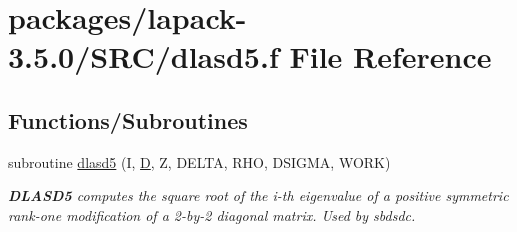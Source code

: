 \hypertarget{dlasd5_8f}{}\section{packages/lapack-\/3.5.0/\+S\+R\+C/dlasd5.f File Reference}
\label{dlasd5_8f}
\subsection*{Functions/\+Subroutines}
\begin{DoxyCompactItemize}
\item 
subroutine \hyperlink{group__auxOTHERauxiliary_gac354f735ef3e53f9ca32242d2db96f74}{dlasd5} (I, \hyperlink{odrpack_8h_a7dae6ea403d00f3687f24a874e67d139}{D}, Z, D\+E\+L\+T\+A, R\+H\+O, D\+S\+I\+G\+M\+A, W\+O\+R\+K)
\begin{DoxyCompactList}\small\item\em {\bfseries D\+L\+A\+S\+D5} computes the square root of the i-\/th eigenvalue of a positive symmetric rank-\/one modification of a 2-\/by-\/2 diagonal matrix. Used by sbdsdc. \end{DoxyCompactList}\end{DoxyCompactItemize}
